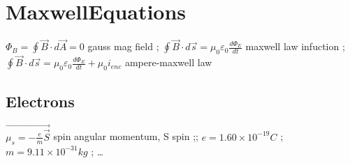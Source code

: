 \section{MaxwellEquations}
$\Phi _B=\oint \vec{B}\cdot d\vec{A}=0$ gauss mag field ;
$\oint \vec{B}\cdot d\vec{s}=\mu _0\varepsilon _0\frac{d\Phi _E}{dt}$ maxwell law infuction ;
$\oint \vec{B}\cdot d\vec{s}=\mu _0\varepsilon _0\frac{d\Phi _E}{dt}+\mu _0i_{enc}$ ampere-maxwell law \\
\subsection{Electrons}
$\vec{\mu _s=-\frac{e}{m}\vec{S}}$ spin angular momentum, S spin ;;
$e=1.60\times 10^{-19}C$ ;
$m=9.11\times 10^{-31}kg$ ; \dots\\